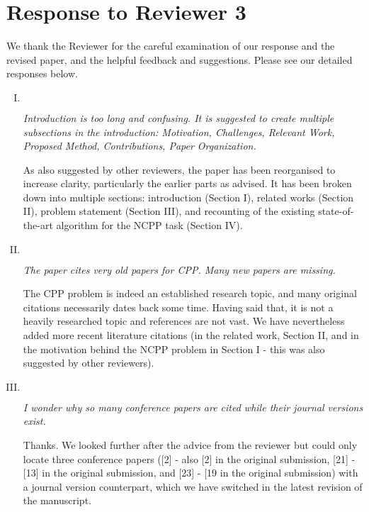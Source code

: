 \documentclass[11pt]{article}
\newenvironment{reviewer}
{\begin{mdframed}[roundcorner = 10pt,fontcolor=blue!70!black]\itshape}
{\end{mdframed}}
\begin{document}
\clearpage

\section*{Response to Reviewer 3}
We thank the Reviewer for the careful examination of our response and the revised paper, and the helpful feedback and suggestions. Please see our detailed responses below.



\begin{enumerate}[I.]
 \item $ $
  \begin{reviewer}
    Introduction is too long and confusing. It is suggested to create multiple subsections in the introduction: Motivation, Challenges, Relevant Work, Proposed Method, Contributions, Paper Organization. 
    \end{reviewer}

\noindent
As also suggested by other reviewers, the paper has been reorganised to increase clarity, particularly the earlier parts as advised. 
It has been broken down into multiple sections: introduction (Section I), related works (Section II), problem statement (Section III), and recounting of the existing state-of-the-art algorithm for the NCPP task (Section IV). 

  \item $ $
  \begin{reviewer}
    The paper cites very old papers for CPP. Many new papers are missing. 
   \end{reviewer}

\noindent
The CPP problem is indeed an established research topic, and many original citations necessarily dates back some time. Having said that, it is not a heavily researched topic and references are not vast.
We have nevertheless added more recent literature citations (in the related work, Section II, and in the motivation behind the NCPP problem in Section I - this was also suggested by other reviewers). 

  \item $ $
  \begin{reviewer}
I wonder why so many conference papers are cited while their journal versions exist. 
   \end{reviewer}

Thanks. %
We looked further after the advice from the reviewer but could only locate three conference papers ([2] - also [2] in the original submission, [21] - [13] in the original submission, and [23] - [19 in the original submission) with a journal version counterpart, 
which we have switched in the latest revision of the manuscript. 


\end{enumerate}
\end{document}
